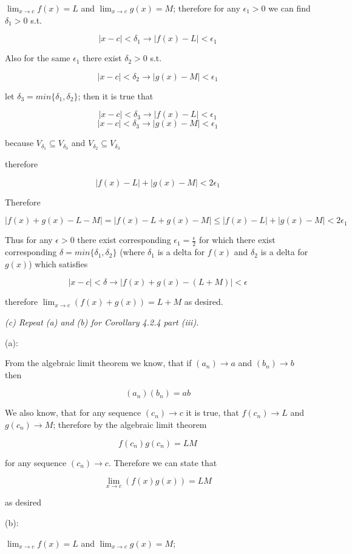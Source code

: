 \documentclass[11pt,oneside,titlepage]{book}
\begin{document}
$\lim_{x \to c} f(x) = L$ and $\lim_{x \to c} g(x) = M$; therefore for any $\epsilon_1 > 0$ we can find $\delta_1 > 0$ s.t.

$$ |x - c| < \delta_1 \to |f(x) - L| < \epsilon_1 $$

Also for the same $\epsilon_1$ there exist $\delta_2 > 0$ s.t.

$$ |x - c| < \delta_2 \to |g(x) - M| < \epsilon_1 $$

let $\delta_3 = min\{\delta_1, \delta_2\}$; then it is true that 

$$ |x - c| < \delta_3 \to |f(x) - L| < \epsilon_1 $$
$$ |x - c| < \delta_3 \to |g(x) - M| < \epsilon_1 $$

because $V_{\delta_1} \subseteq V_{\delta_3} $ and $V_{\delta_2} \subseteq V_{\delta_3} $

therefore

$$|f(x) - L| + |g(x) - M| < 2 \epsilon_1$$

Therefore 

$$ |f(x) + g(x) - L -  M| = |f(x) - L + g(x) - M| \leq |f(x) - L| + |g(x) - M| < 2 \epsilon_1 $$

Thus for any $\epsilon > 0$ there exist corresponding $\epsilon_1 = \frac{\epsilon}{2}$ for which there
exist corresponding $\delta = min\{\delta_1, \delta_2\}$ (where $\delta_1$ is a delta for $f(x)$ and
$\delta_2$ is a delta for $g(x)$) which satisfies

$$|x - c| < \delta \to |f(x) + g(x) - (L + M)| < \epsilon$$

therefore $\lim_{x \to c}(f(x) + g(x)) = L + M$ as desired.

\textit{(c) Repeat (a) and (b) for Corollary 4.2.4 part (iii).}

(a):

From the algebraic limit theorem we know, that if $(a_n) \to a$ and $(b_n) \to b$ then

$$(a_n) (b_n) = a  b$$

We also know, that for any sequence $(c_n) \to c$ it is true, that $f(c_n) \to L$ and $g(c_n) \to M$;
therefore by the algebraic limit theorem

$$f(c_n)  g(c_n) = L M$$

for any sequence $(c_n) \to c$. Therefore we can state that

$$\lim_{x \to c}(f(x)g(x)) = L M $$

as desired

(b):

$\lim_{x \to c} f(x) = L$ and $\lim_{x \to c} g(x) = M$;
\end{document}
